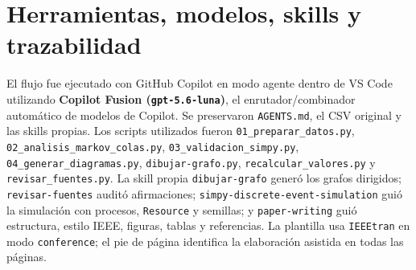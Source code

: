 \documentclass[conference]{IEEEtran}
\begin{document}



\appendices
\section{Herramientas, modelos, skills y trazabilidad}
El flujo fue ejecutado con GitHub Copilot en modo agente dentro de VS Code utilizando
\textbf{Copilot Fusion (\texttt{gpt-5.6-luna})}, el enrutador/combinador automático de modelos de Copilot.
Se preservaron \texttt{AGENTS.md}, el CSV original y las skills propias. Los scripts utilizados
fueron \texttt{01\_preparar\_datos.py}, \texttt{02\_analisis\_markov\_colas.py},
\texttt{03\_validacion\_simpy.py}, \texttt{04\_generar\_diagramas.py},
\texttt{dibujar-grafo.py}, \texttt{recalcular\_valores.py} y
\texttt{revisar\_fuentes.py}. La skill propia \texttt{dibujar-grafo} generó los grafos
dirigidos; \texttt{revisar-fuentes} auditó afirmaciones; \texttt{simpy-discrete-event-simulation}
guió la simulación con procesos, \texttt{Resource} y semillas; y \texttt{paper-writing} guió
estructura, estilo IEEE, figuras, tablas y referencias. La plantilla usa
\texttt{IEEEtran} en modo \texttt{conference}; el pie de página identifica la elaboración
asistida en todas las páginas.
\end{document}
